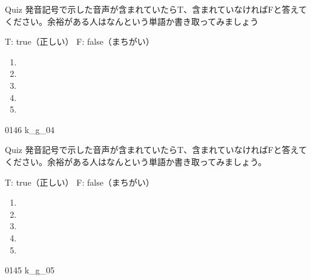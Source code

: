 \documentclass[aspectratio=169, xcolor={dvipsnames,table}]{beamer}
\begin{document}
\begin{frame}[plain]{Quiz }
  \large 発音記号で示した音声が含まれていたらT、含まれていなければFと答えてください。余裕がある人はなんという単語か書き取ってみましょう

  \hfill{}{\scriptsize T: true（正しい）\hspace{5pt} F: false（まちがい）}
  \begin{enumerate}
    \item \mbox{}\hspace{1\zw}

    \item \mbox{}\hspace{1\zw}

    \item \mbox{}\hspace{1\zw}

    \item \mbox{}\hspace{1\zw}

    \item \mbox{}\hspace{1\zw}
  \end{enumerate}

  \hfill{\tiny 0146}\,{\scriptsize {}\,{\tiny k\_g\_04}}
\end{frame}
\begin{frame}[plain]{Quiz }
  \large 発音記号で示した音声が含まれていたらT、含まれていなければFと答えてください。余裕がある人はなんという単語か書き取ってみましょう。

  \hfill{}{\scriptsize T: true（正しい）\hspace{5pt} F: false（まちがい）}
  \begin{enumerate}
    \item \mbox{}\visible<2->{T}\hspace{1\zw}

    \item \mbox{}\hspace{1\zw}

    \item \mbox{}\hspace{1\zw}

    \item \mbox{}\hspace{1\zw}

    \item \mbox{}\hspace{1\zw}
  \end{enumerate}

  \hfill{\tiny 0145}\,{\scriptsize {}\,{\tiny k\_g\_05}}
\end{frame}
\end{document}
